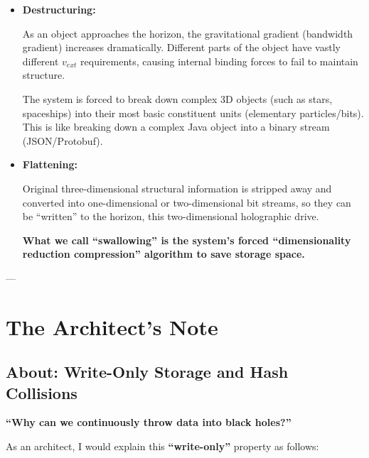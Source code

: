 \begin{itemize}
\item \textbf{Destructuring:}

    As an object approaches the horizon, the gravitational gradient (bandwidth gradient) increases dramatically. Different parts of the object have vastly different \textbf{$v_{ext}$} requirements, causing internal binding forces to fail to maintain structure.

    The system is forced to break down complex 3D objects (such as stars, spaceships) into their most basic constituent units (elementary particles/bits). This is like breaking down a complex Java object into a binary stream (JSON/Protobuf).

\item \textbf{Flattening:}

    Original three-dimensional structural information is stripped away and converted into one-dimensional or two-dimensional bit streams, so they can be ``written'' to the horizon, this two-dimensional holographic drive.

    \textbf{What we call ``swallowing'' is the system's forced ``dimensionality reduction compression'' algorithm to save storage space.}
\end{itemize}

---

\section{The Architect's Note}

\subsection{About: Write-Only Storage and Hash Collisions}

\textbf{``Why can we continuously throw data into black holes?''}

As an architect, I would explain this \textbf{``write-only''} property as follows:

